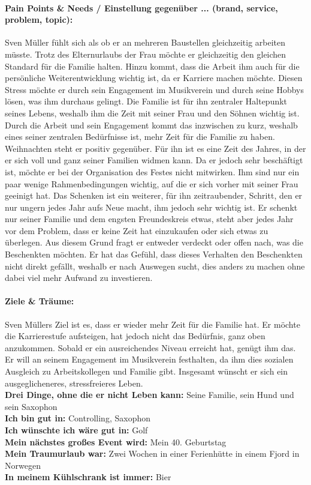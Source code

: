 \paragraph{Pain Points & Needs / Einstellung gegenüber ... (brand, service, problem, topic):}
Sven Müller fühlt sich als ob er an mehreren Baustellen gleichzeitig arbeiten müsste. Trotz des Elternurlaubs der Frau möchte er gleichzeitig den gleichen Standard für die Familie halten. Hinzu kommt, dass die Arbeit ihm auch für die persönliche Weiterentwicklung wichtig ist, da er Karriere machen möchte. Diesen Stress möchte er durch sein Engagement im Musikverein und durch seine Hobbys lösen, was ihm durchaus gelingt. Die Familie ist für ihn zentraler Haltepunkt seines Lebens, weshalb ihm die Zeit mit seiner Frau und den Söhnen wichtig ist. Durch die Arbeit und sein Engagement kommt das inzwischen zu kurz, weshalb eines seiner zentralen Bedürfnisse ist, mehr Zeit für die Familie zu haben.\\
Weihnachten steht er positiv gegenüber. Für ihn ist es eine Zeit des Jahres, in der er sich voll und ganz seiner Familien widmen kann. Da er jedoch sehr beschäftigt ist, möchte er bei der Organisation des Festes nicht mitwirken. Ihm sind nur ein paar wenige Rahmenbedingungen wichtig, auf die er sich vorher mit seiner Frau geeinigt hat. Das Schenken ist ein weiterer, für ihn zeitraubender, Schritt, den er nur ungern jedes Jahr aufs Neue macht, ihm jedoch sehr wichtig ist. Er schenkt nur seiner Familie und dem engsten Freundeskreis etwas, steht aber jedes Jahr vor dem Problem, dass er keine Zeit hat einzukaufen oder sich etwas zu überlegen. Aus diesem Grund fragt er entweder verdeckt oder offen nach, was die Beschenkten möchten. Er hat das Gefühl, dass dieses Verhalten den Beschenkten nicht direkt gefällt, weshalb er nach Auswegen sucht, dies anders zu machen ohne dabei viel mehr Aufwand zu investieren.\\
\hline
\paragraph{Ziele & Träume:}
Sven Müllers Ziel ist es, dass er wieder mehr Zeit für die Familie hat. Er möchte die Karrierestufe aufsteigen, hat jedoch nicht das Bedürfnis, ganz oben anzukommen. Sobald er ein ausreichendes Niveau erreicht hat, genügt ihm das. Er will an seinem Engagement im Musikverein festhalten, da ihm dies sozialen Ausgleich zu Arbeitskollegen und Familie gibt. Insgesamt wünscht er sich ein ausgeglicheneres, stressfreieres Leben.\\
\hline
\vspace*{0.1in}
\textbf{Drei Dinge, ohne die er nicht Leben kann:} Seine Familie, sein Hund und sein Saxophon \\
\textbf{Ich bin gut in:} Controlling, Saxophon\\
\textbf{Ich wünschte ich wäre gut in:} Golf \\
\textbf{Mein nächstes großes Event wird:} Mein 40. Geburtstag \\
\textbf{Mein Traumurlaub war:} Zwei Wochen in einer Ferienhütte in einem Fjord in Norwegen \\
\textbf{In meinem Kühlschrank ist immer:} Bier \\
\hline

